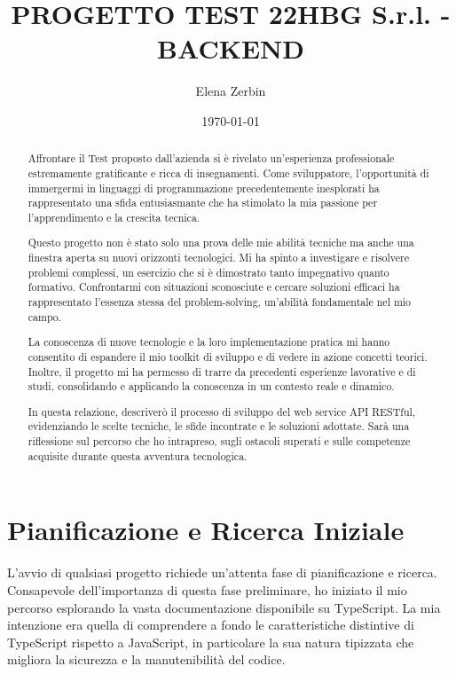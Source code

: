 \documentclass[12pt]{article}
\title{ PROGETTO TEST 22HBG S.r.l. - BACKEND}
\author{Elena Zerbin}
\date{\today}
\begin{document}
\maketitle

\begin{abstract}
Affrontare il Test proposto dall'azienda si è rivelato un'esperienza professionale estremamente gratificante e ricca di insegnamenti. Come sviluppatore, l'opportunità di immergermi in linguaggi di programmazione precedentemente inesplorati ha rappresentato una sfida entusiasmante che ha stimolato la mia passione per l'apprendimento e la crescita tecnica.

Questo progetto non è stato solo una prova delle mie abilità tecniche ma anche una finestra aperta su nuovi orizzonti tecnologici. Mi ha spinto a investigare e risolvere problemi complessi, un esercizio che si è dimostrato tanto impegnativo quanto formativo. Confrontarmi con situazioni sconosciute e cercare soluzioni efficaci ha rappresentato l'essenza stessa del problem-solving, un'abilità fondamentale nel mio campo.

La conoscenza di nuove tecnologie e la loro implementazione pratica mi hanno consentito di espandere il mio toolkit di sviluppo e di vedere in azione concetti teorici. Inoltre, il progetto mi ha permesso di trarre da precedenti esperienze lavorative e di studi, consolidando e applicando la conoscenza in un contesto reale e dinamico.

In questa relazione, descriverò il processo di sviluppo del web service API RESTful, evidenziando le scelte tecniche, le sfide incontrate e le soluzioni adottate. Sarà una riflessione sul percorso che ho intrapreso, sugli ostacoli superati e sulle competenze acquisite durante questa avventura tecnologica.
\end{abstract}

\section{Pianificazione e Ricerca Iniziale}

L'avvio di qualsiasi progetto richiede un'attenta fase di pianificazione e ricerca. Consapevole dell'importanza di questa fase preliminare, ho iniziato il mio percorso esplorando la vasta documentazione disponibile su TypeScript. La mia intenzione era quella di comprendere a fondo le caratteristiche distintive di TypeScript rispetto a JavaScript, in particolare la sua natura tipizzata che migliora la sicurezza e la manutenibilità del codice.
\end{document}
